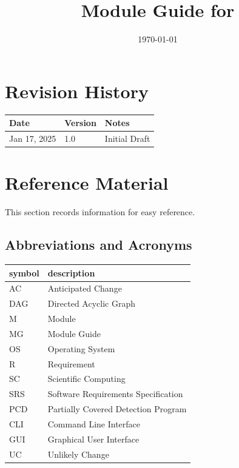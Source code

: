 \documentclass[12pt, titlepage]{article}
\begin{document}
\title{Module Guide for \progname{}} 
\author{\authname}
\date{\today}

\maketitle


\section{Revision History}

\begin{tabularx}{\textwidth}{p{3cm}p{2cm}X}
\toprule {\bf Date} & {\bf Version} & {\bf Notes}\\
\midrule
Jan 17, 2025 & 1.0 & Initial Draft\\
\bottomrule
\end{tabularx}

\newpage

\section{Reference Material}

This section records information for easy reference.

\subsection{Abbreviations and Acronyms}

\renewcommand{\arraystretch}{1.2}
\begin{tabular}{l l} 
  \toprule		
  \textbf{symbol} & \textbf{description}\\
  \midrule 
  AC & Anticipated Change\\
  DAG & Directed Acyclic Graph \\
  M & Module \\
  MG & Module Guide \\
  OS & Operating System \\
  R & Requirement\\
  SC & Scientific Computing \\
  SRS & Software Requirements Specification\\
  PCD & Partially Covered Detection Program \\
  CLI & Command Line Interface \\
  GUI & Graphical User Interface \\
  UC & Unlikely Change \\

  \bottomrule
\end{tabular}\\
\end{document}
